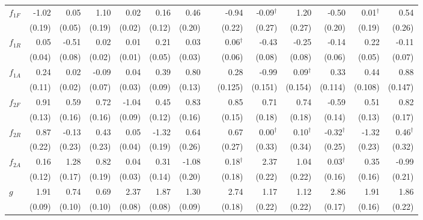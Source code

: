 \begin{table} [H]
\begin{tabular}{lrrrrrrrrrrrrr}
$f_{1F}$ & -1.02  & 0.05   & 1.10   & 0.02   & 0.16   & 0.46   && -0.94   & \cellcolor{gray!25}-0.09$^{\dagger}$   & 1.20    & \cellcolor{gray!25}-0.50   & 0.01$^{\dagger}$    & 0.54 \\ 
         & (0.19) & (0.05) & (0.19) & (0.02) & (0.12) & (0.20) && (0.22)  & (0.27)  & (0.27)  & (0.20)  & (0.19)  & (0.26) \\ [0.08cm]
$f_{1R}$ & 0.05   & -0.51  & 0.02   & 0.01   & 0.21   & 0.03   && 0.06$^{\dagger}$    & -0.43   & \cellcolor{gray!25}-0.25   & \cellcolor{gray!25}-0.14   & 0.22    & \cellcolor{gray!25}-0.11 \\ 
         & (0.04) & (0.08) & (0.02) & (0.01) & (0.05) & (0.03) && (0.06)  & (0.08)  & (0.08)  & (0.06)  & (0.05)  & (0.07) \\ [0.08cm]
$f_{1A}$ & 0.24   & 0.02   & -0.09  & 0.04   & 0.39   & 0.80   && 0.28    & \cellcolor{gray!25}-0.99   & \cellcolor{gray!25}0.09$^{\dagger}$    & \cellcolor{gray!25}0.33    & 0.44    & 0.88 \\ 
         & (0.11) & (0.02) & (0.07) & (0.03) & (0.09) & (0.13) && (0.125) & (0.151) & (0.154) & (0.114) & (0.108) & (0.147) \\ [0.08cm]
$f_{2F}$ & 0.91   & 0.59   & 0.72   & -1.04  & 0.45   & 0.83   && 0.85    & 0.71    & 0.74    & \cellcolor{gray!25}-0.59   & 0.51    & 0.82 \\ 
         & (0.13) & (0.16) & (0.16) & (0.09) & (0.12) & (0.16) && (0.15)  & (0.18)  & (0.18)  & (0.14)  & (0.13)  & (0.17) \\ [0.08cm]
$f_{2R}$ & 0.87   & -0.13  & 0.43   & 0.05   & -1.32  & 0.64   && 0.67    & 0.00$^{\dagger}$    & 0.10$^{\dagger}$    & \cellcolor{gray!25}-0.32$^{\dagger}$   & -1.32   & 0.46$^{\dagger}$ \\ 
         & (0.22) & (0.23) & (0.23) & (0.04) & (0.19) & (0.26) && (0.27)  & (0.33)  & (0.34)  & (0.25)  & (0.23)  & (0.32) \\ [0.07cm]
$f_{2A}$ & 0.16   & 1.28   & 0.82   & 0.04   & 0.31   & -1.08  && 0.18$^{\dagger}$    & 2.37    & 1.04    & 0.03$^{\dagger}$    & 0.35    & -0.99 \\ 
         & (0.12) & (0.17) & (0.19) & (0.03) & (0.14) & (0.20) && (0.18)  & (0.22)  & (0.22)  & (0.16)  & (0.16)  & (0.21) \\ [0.07cm]
$g$      & 1.91   & 0.74   & 0.69   & 2.37   & 1.87   & 1.30   && 2.74    & 1.17    & 1.12    & 2.86    & 1.91    & 1.86 \\ 
         & (0.09) & (0.10) & (0.10) & (0.08) & (0.08) & (0.09) && (0.18)  & (0.22)  & (0.22)  & (0.17)  & (0.16)  & (0.22) \\ [0.07cm]

\end{tabular}
\end{table}

